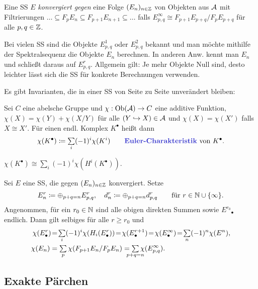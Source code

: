\documentclass{cheat-sheet}
\newcommand{\CC}[1]{{#1}_{\bullet}} %
\newcommand{\CCC}[1]{{#1}^{\bullet}} %
\begin{document}
\begin{defn}
  Eine SS $E$ \emph{konvergiert gegen} eine Folge $(E_n)_{n \in \mathbb{Z}}$ von Objekten aus $\mathcal{A}$ mit Filtrierungen $\ldots \subseteq F_p E_n \subseteq F_{p+1} E_{n+1} \subseteq \ldots$ falls $E^\infty_{p,q} \cong F_{p+1} E_{p+q} / F_p E_{p+q}$ für alle $p, q \in \mathbb{Z}$.
\end{defn}

\begin{bem}
  Bei vielen SS sind die Objekte $E^1_{p,q}$ oder $E^2_{p,q}$ bekannt und man möchte mithilfe der Spektralsequenz die Objekte $E_n$ berechnen.
  In anderen Anw. kennt man $E_n$ und schließt daraus auf $E^r_{p,q}$.
  Allgemein gilt: Je mehr Objekte Null sind, desto leichter lässt sich die SS für konkrete Berechnungen verwenden.
\end{bem}

\begin{bem}
  Es gibt Invarianten, die in einer SS von Seite zu Seite unverändert bleiben:
\end{bem}

\begin{defn}
  Sei $C$ eine abelsche Gruppe und $\chi : \operatorname{Ob}(\mathcal{A}) \to C$ eine additive Funktion, \dh{} $\chi(X) = \chi(Y) + \chi(X/Y)$ für alle $(Y \hookrightarrow X) \in \mathcal{A}$ und $\chi(X) = \chi(X')$ falls $X \cong X'$.
  Für einen endl. Komplex $\CCC{K}$ heißt dann
  \[
    \chi(\CCC{K}) \coloneqq \sum_i (-1)^i \chi(K^i) \qquad
    \text{\emph{Euler-Charakteristik} von $\CCC{K}$.}
  \]
\end{defn}

\begin{lem}
  $\chi(\CCC{K}) \cong \sum_i (-1)^i \chi(H^i(\CCC{K}))$.
\end{lem}

\begin{samepage}

\begin{bem}
  Sei $E$ eine SS, die gegen $(E_n)_{n \in \mathbb{Z}}$ konvergiert. Setze
  \[
    E_n^r \coloneqq \oplus_{p+q=n} E^r_{p,q}, \quad
    d^r_n \coloneqq \oplus_{p+q=n} d^r_{p,q} \qquad
    \text{für } r \in \mathbb{N} \cup \{ \infty \}.
  \]
  Angenommen, für ein $r_0 \in \mathbb{N}$ sind alle obigen direkten Summen sowie $\CC{E^{r_0}}$ endlich.
  Dann gilt selbiges für alle $r \geq r_0$ und
  \begin{align*}
    \chi(\CC{E}^r) \!&=\! \sum_i (-1)^i \chi(H_i(\CC{E}^r)) \!=\! \chi(\CC{E}^{r+1}) \!=\! \chi(\CC{E}^\infty) \!=\! \sum_n (-1)^n \chi(E^n), \\
    \chi(E_n) & = \sum_p \chi(F_{p+1} E_n / F_p E_n) = \sum_{\mathclap{p+q=n}} \chi(E^\infty_{p,q}). \\
  \end{align*}
\end{bem}

\subsection{Exakte Pärchen}
\end{samepage}
\end{document}
